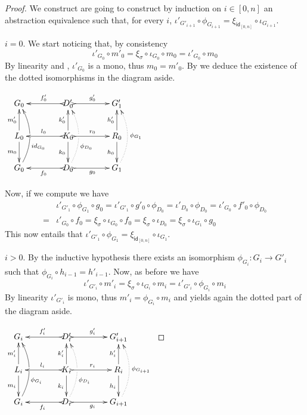 \documentclass[a4paper,UKenglish,cleveref,pdftex, thm-restate,numberwithinsect,anonymous]{lipics}
\newcommand{\id}[1]{\mathsf{id}_{#1}}
\def\G{\textbf {\textup{G}}}
\begin{document}
\begin{proof}We construct are going to construct by induction on $i\in [0,n]$ an abstraction equivalence such that, for every $i$, $\iota'_{G'_{i+1}}\circ \phi_{G_{i+1}}=\xi_{\id{[0,n]}}\circ \iota_{G_{i+1}}$.
	
	\smallskip \noindent \parbox{8.2cm}{$i=0$. We start noticing that, by consistency
		\[\iota'_{G_0}\circ m'_0=\xi_\sigma \circ \iota_{G_0}\circ m_0=\iota'_{G_0}\circ m_0\]
		By linearity and , $\iota'_{G_0}$ is a mono, thus $m_0=m'_0$. By   we deduce the existence of the dotted isomorphisms in the diagram aside.} \parbox{4cm}{\vspace{0ex}$\xymatrix@C=40pt{G_0&D'_0 \ar@{>->}[r]^{g'_0}
			\ar@{>->}[l]_{f'_0}&G'_{1}\\ L_0 \ar[u]^{m'_0} \ar[d]_{m_0}& K_0
			\ar[u]^{k'_0} \ar[d]_{k_0} \ar@{>->}[r]^{r_0} \ar@{>->}[l]_{l_0}
			&R_0\ar[u]^{h'_0} \ar[d]_{h_0}\\G_0
			\ar@/_.45cm/[uu]_(.35){\id{G_0}}|\hole& D_0 \ar@{>->}[l]^{f_0}  \ar@{.>}@/_.45cm/[uu]_(.35){\phi_{D_0}}|\hole
			\ar@{>->}[r]_{g_0}& G_{1}\ar@{.>}@/_.45cm/[uu]_{\phi_{G_1}}}$}
	
	Now, if we compute we have
	\begin{align*}
		&\iota'_{G'_1}\circ \phi_{G_1}\circ g_0=\iota'_{G'_1}\circ g'_0\circ \phi_{D_0}=\iota'_{D_0}\circ \phi_{D_0}=\iota'_{G_0}\circ f'_0\circ \phi_{D_0}\\=&\iota'_{G_0}\circ f_0=\xi_{\sigma} \circ \iota_{G_0}\circ  f_0=\xi_{\sigma} \circ \iota_{D_0}=\xi_{\sigma} \circ \iota_{G_1}\circ g_0 
	\end{align*}
	This now entails that $\iota'_{G'_1}\circ \phi_{G_1}=\xi_{\id{[0,n]}}\circ \iota_{G_1}$.
	
	
	\smallskip  \noindent \parbox{7.5cm}{$i>0$. By the inductive hypothesis there exists an isomorphism $\phi_{G_{i}}\colon G_{i}\to G'_i$ such that $\phi_{G_{i}}\circ h_{i-1}=h'_{i-1}$. Now, as before we have
		\[\iota'_{G'_{i}}\circ m'_{i}=\xi_{\sigma}\circ \iota_{G_i}\circ m_{i}=\iota'_{G'_{i}}\circ \phi_{G_{i}} \circ m_i \]
		By linearity $\iota'_{G'_{i}}$ is mono, thus $m'_i=\phi_{G_{i}} \circ m_i$ and  yields again the dotted part of the diagram aside.}
	\parbox{4cm}{\vspace{-2em}$\xymatrix@C=40pt{G_i&D'_i \ar@{>->}[r]^{g'_i}
			\ar@{>->}[l]_{f'_i}&G'_{i+1}\\ L_i \ar[u]^{m'_i} \ar[d]_{m_i}& K_i
			\ar[u]^{k'_i} \ar[d]_{k_i} \ar@{>->}[r]^{r_i} \ar@{>->}[l]_{l_i}
			&R_i\ar[u]^{h'_i} \ar[d]_{h_i}\\G_i
			\ar@/_.45cm/[uu]_(.35){\phi_{G_i}}|\hole& D_i \ar@{>->}[l]^{f_i}  \ar@{.>}@/_.45cm/[uu]_(.35){\phi_{D_i}}|\hole
			\ar@{>->}[r]_{g_i}& G_{i+1}\ar@{.>}@/_.45cm/[uu]_{\phi_{G_{i+1}}}}$}
	

\end{proof}
\end{document}
